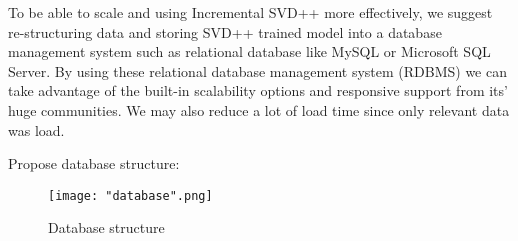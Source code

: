 \documentclass[oneside,13pt]{extreport}
\begin{document}
To be able to scale and using Incremental SVD++ more effectively, we suggest re-structuring data and storing SVD++ trained model into a database management system such as relational database like MySQL or Microsoft SQL Server. By using these relational database management system (RDBMS) we can take advantage of the built-in scalability options and responsive support from its' huge communities. We may also reduce a lot of load time since only relevant data was load.

Propose database structure: 

\begin{figure}[h!]
    \centering
    \texttt{[image: "database".png]} 
    \caption{Database structure}
    \label{fig:database}
\end{figure}



\vfill
{}




\nocite{*}





\printindex
\end{document}
